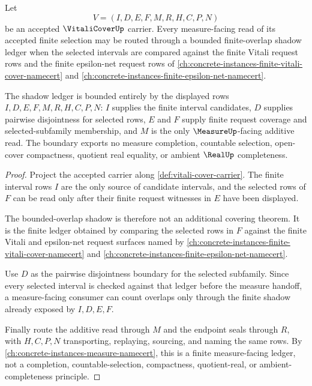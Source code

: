 \begin{theorem}
\label{thm:vitali-cover-besicovitch-finite-overlap-boundary}
Let
$$
V=(I,D,E,F,M,R,H,C,P,N)
$$
be an accepted $\VitaliCoverUp$ carrier. Every measure-facing read of its accepted finite selection may be routed through a bounded finite-overlap shadow ledger when the selected intervals are compared against the finite Vitali request rows and the finite epsilon-net request rows of \autoref{ch:concrete-instances-finite-vitali-cover-namecert} and \autoref{ch:concrete-instances-finite-epsilon-net-namecert}.

The shadow ledger is bounded entirely by the displayed rows $I,D,E,F,M,R,H,C,P,N$: $I$ supplies the finite interval candidates, $D$ supplies pairwise disjointness for selected rows, $E$ and $F$ supply finite request coverage and selected-subfamily membership, and $M$ is the only $\MeasureUp$-facing additive read. The boundary exports no measure completion, countable selection, open-cover compactness, quotient real equality, or ambient $\RealUp$ completeness.
\end{theorem}
\begin{proof}
Project the accepted carrier along \autoref{def:vitali-cover-carrier}. The finite interval rows $I$ are the only source of candidate intervals, and the selected rows of $F$ can be read only after their finite request witnesses in $E$ have been displayed.

The bounded-overlap shadow is therefore not an additional covering theorem. It is the finite ledger obtained by comparing the selected rows in $F$ against the finite Vitali and epsilon-net request surfaces named by \autoref{ch:concrete-instances-finite-vitali-cover-namecert} and \autoref{ch:concrete-instances-finite-epsilon-net-namecert}.

Use $D$ as the pairwise disjointness boundary for the selected subfamily. Since every selected interval is checked against that ledger before the measure handoff, a measure-facing consumer can count overlaps only through the finite shadow already exposed by $I,D,E,F$.

Finally route the additive read through $M$ and the endpoint seals through $R$, with $H,C,P,N$ transporting, replaying, sourcing, and naming the same rows. By \autoref{ch:concrete-instances-measure-namecert}, this is a finite measure-facing ledger, not a completion, countable-selection, compactness, quotient-real, or ambient-completeness principle.
\end{proof}

